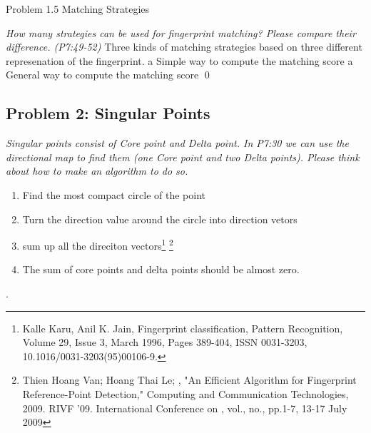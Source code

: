 \documentclass[
        ]{beamer}
\begin{document}
    		\begin{frame}[t]{Problem 1.5 Matching Strategies}
    			\begin{overprint}
    			\emph{How many strategies can be used for fingerprint matching? Please compare their difference. (P7:49-52)}
    				\onslide<2>  %
    				Three kinds of matching strategies based on three different represenation of the fingerprint.
    				\onslide<3>  %
    				\onslide<4>  %
    				a Simple way to compute the matching score
    				\onslide<5>  %
    				a General way to compute the matching score
							\qed		
    			\end{overprint}
    		\end{frame}

    \subsection{Problem 2: Singular Points}
    
    		\begin{frame}[t]{\subsecname}
    			\begin{overprint}
    			\onslide<1>
    			\emph{Singular points consist of Core point and Delta point. In P7:30 we can use the directional map to find them (one Core point and two Delta points). Please think about how to make an algorithm to do so. }
    				\onslide<2> \inpdfc{7}{30} %
    				\onslide<3> 
    				\begin{enumerate}
    				\item Find the most compact circle of the point
    				\item Turn the direction value around the circle into direction vetors
    				\item sum up all the direciton vectors\footnote{Kalle Karu, Anil K. Jain, Fingerprint classification, Pattern Recognition, Volume 29, Issue 3, March 1996, Pages 389-404, ISSN 0031-3203, 10.1016/0031-3203(95)00106-9.}
\footnote{Thien Hoang Van; Hoang Thai Le; , "An Efficient Algorithm for Fingerprint Reference-Point Detection," Computing and Communication Technologies, 2009. RIVF '09. International Conference on , vol., no., pp.1-7, 13-17 July 2009}
    				\item The sum of core points and delta points should be almost zero.
    				\end{enumerate}.
    			\end{overprint}
    		\end{frame}
\end{document}
